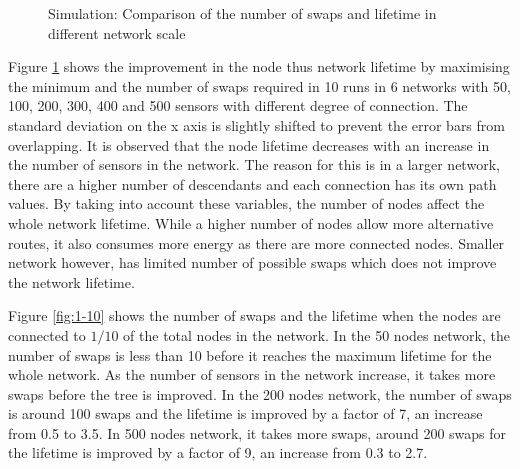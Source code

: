 \begin{figure}
\centering              
{}
\caption{Simulation: Comparison of the number of swaps and lifetime in different network scale}
\label{fig:maxmin}
\end{figure}

Figure \ref{fig:maxmin} shows the improvement in the node thus network lifetime by maximising the minimum and the number of swaps required in 10 runs in 6 networks with 50, 100, 200, 300, 400 and 500 sensors with different degree of connection. 
The standard deviation on the x axis is slightly shifted to prevent the error bars from overlapping.
It is observed that the node lifetime decreases with an increase in the number of sensors in the network. The reason for this is in a larger network, there are a higher number of descendants and each connection has its own path values. By taking into account these variables, the number of nodes affect the whole network lifetime. While a higher number of nodes allow more alternative routes, it also consumes more energy as there are more connected nodes. Smaller network however, has limited number of possible swaps which does not improve the network lifetime.

Figure \ref{fig:1-10} shows the number of swaps and the lifetime when the nodes are connected to $1/10$ of the total nodes in the network. 
In the 50 nodes network, the number of swaps is less than 10 before it reaches the maximum lifetime for the whole network. 
As the number of sensors in the network increase, it takes more swaps before the tree is improved. 
In the 200 nodes network, the number of swaps is around 100 swaps and the lifetime is improved by a factor of 7, an increase from 0.5 to 3.5. In 500 nodes network, it takes more swaps, around 200 swaps for the lifetime is improved by a factor of 9, an increase from 0.3 to 2.7.

